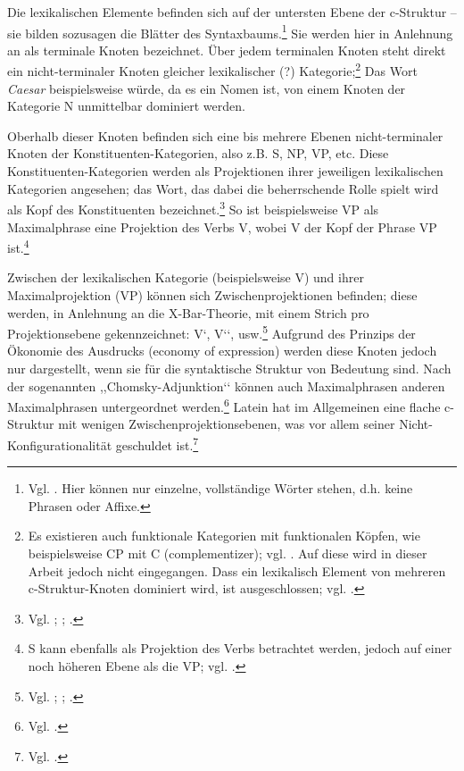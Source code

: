 \documentclass[12pt,a4paper]{article}
\begin{document}
Die lexikalischen Elemente befinden sich auf der untersten Ebene der c-Struktur -- sie bilden sozusagen die Blätter des Syntaxbaums.\footnote{Vgl. \cite[7]{Dal}. Hier können nur einzelne, vollständige Wörter stehen, d.h. keine Phrasen oder Affixe.} Sie werden hier in Anlehnung an \cite[14; 61?]{Rohrer} als terminale Knoten bezeichnet. Über jedem terminalen Knoten steht direkt ein nicht-terminaler Knoten gleicher lexikalischer (?) Kategorie;\footnote{Es existieren auch funktionale Kategorien mit funktionalen Köpfen, wie beispielsweise CP mit C (complementizer); vgl. \cite[46; 53; 63-4]{Dal}. Auf diese wird in dieser Arbeit jedoch nicht eingegangen. Dass ein lexikalisch Element von mehreren c-Struktur-Knoten dominiert wird, ist ausgeschlossen; vgl. \cite[63]{Skript}.} Das Wort \textit{Caesar} beispielsweise würde, da es ein Nomen ist, von einem Knoten der Kategorie N unmittelbar dominiert werden.

Oberhalb dieser Knoten befinden sich eine bis mehrere Ebenen nicht-terminaler Knoten der Konstituenten-Kategorien, also z.B. S, NP, VP, etc. Diese Konstituenten-Kategorien werden als Projektionen ihrer jeweiligen lexikalischen Kategorien angesehen; das Wort, das dabei die beherrschende Rolle spielt wird als Kopf des Konstituenten bezeichnet.\footnote{Vgl. \cite[13; 15]{Rohrer}; \cite[64]{Dal}; \cite[5; 28]{Skript}.} So ist beispielsweise VP als Maximalphrase eine Projektion des Verbs V, wobei V der Kopf der Phrase VP ist.\footnote{S kann ebenfalls als Projektion des Verbs betrachtet werden, jedoch auf einer noch höheren Ebene als die VP; vgl. \cite[15]{Rohrer}.} 

Zwischen der lexikalischen Kategorie (beispielsweise V) und ihrer Maximalprojektion (VP) können sich Zwischenprojektionen befinden; diese werden, in Anlehnung an die X-Bar-Theorie, mit einem Strich pro Projektionsebene gekennzeichnet: V‘, V‘‘, usw.\footnote{Vgl. \cite[15-6]{Rohrer}; \cite[56-7]{Dal}; \cite[5]{Skript}.} Aufgrund des Prinzips der Ökonomie des Ausdrucks (economy of expression) werden diese Knoten jedoch nur dargestellt, wenn sie für die syntaktische Struktur von Bedeutung sind. Nach der sogenannten ,,Chomsky-Adjunktion‘‘ können auch Maximalphrasen anderen Maximalphrasen untergeordnet werden.\footnote{Vgl. \cite[46; 57]{Dal}.} Latein hat im Allgemeinen eine flache c-Struktur mit wenigen Zwischenprojektionsebenen, was vor allem seiner Nicht-Konfigurationalität geschuldet ist.\footnote{Vgl. \cite[46]{Rohrer}.}
\end{document}
